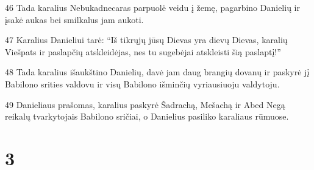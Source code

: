 \par 46 Tada karalius Nebukadnecaras parpuolė veidu į žemę, pagarbino Danielių ir įsakė aukas bei smilkalus jam aukoti. 
\par 47 Karalius Danieliui tarė: “Iš tikrųjų jūsų Dievas yra dievų Dievas, karalių Viešpats ir paslapčių atskleidėjas, nes tu sugebėjai atskleisti šią paslaptį!” 
\par 48 Tada karalius išaukštino Danielių, davė jam daug brangių dovanų ir paskyrė jį Babilono srities valdovu ir visų Babilono išminčių vyriausiuoju valdytoju. 
\par 49 Danieliaus prašomas, karalius paskyrė Šadrachą, Mešachą ir Abed Negą reikalų tvarkytojais Babilono sričiai, o Danielius pasiliko karaliaus rūmuose.



\chapter{3}


